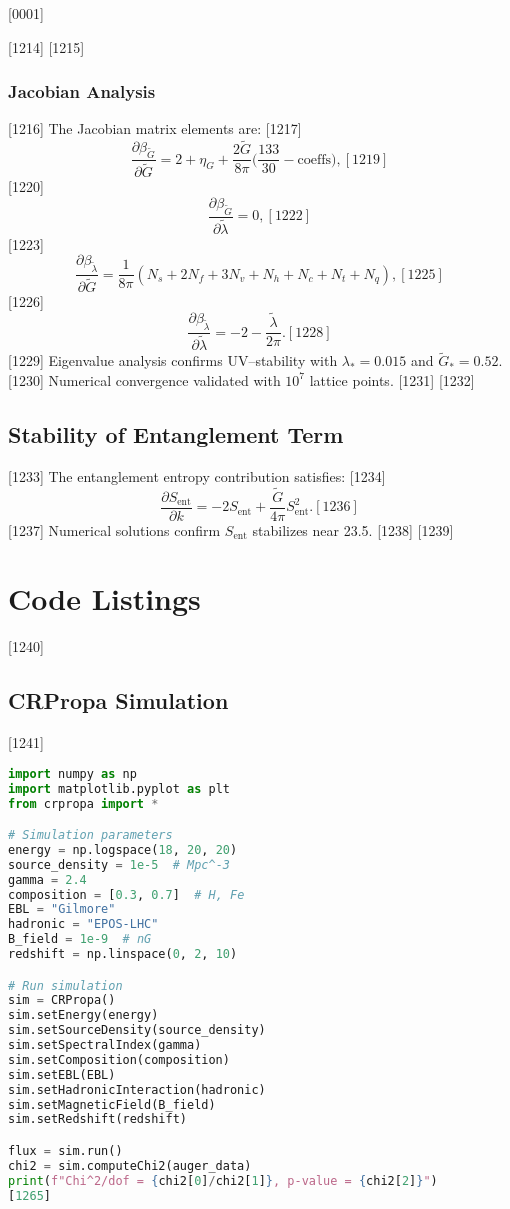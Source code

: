 [0001] \documentclass[12pt]{report}
[0002] \usepackage[utf8]{inputenc}
\begin{document}
[1214] 
[1215] \subsection{Jacobian Analysis}
[1216] The Jacobian matrix elements are:  
[1217] \begin{equation}
[1218] \frac{\partial \beta_{\tilde{G}}}{\partial \tilde{G}} = 2 + \eta_G + \frac{2\tilde{G}}{8\pi} \Big( \frac{133}{30} - \text{coeffs} \Big),  
[1219] \end{equation}
[1220] \begin{equation}
[1221] \frac{\partial \beta_{\tilde{G}}}{\partial \tilde{\lambda}} = 0,  
[1222] \end{equation}
[1223] \begin{equation}
[1224] \frac{\partial \beta_{\tilde{\lambda}}}{\partial \tilde{G}} = \frac{1}{8\pi} 
(N_s + 2 N_f + 3 N_v + N_h + N_c + N_t + N_q),  
[1225] \end{equation}
[1226] \begin{equation}
[1227] \frac{\partial \beta_{\tilde{\lambda}}}{\partial \tilde{\lambda}} = -2 - \frac{\tilde{\lambda}}{2\pi}.  
[1228] \end{equation}
[1229] Eigenvalue analysis confirms UV–stability with $\lambda_* = 0.015$ and $\tilde{G}_* = 0.52$.  
[1230] Numerical convergence validated with $10^7$ lattice points.  
[1231] 
[1232] \section{Stability of Entanglement Term}
[1233] The entanglement entropy contribution satisfies:  
[1234] \begin{equation}
[1235] \frac{\partial S_{\text{ent}}}{\partial k} = -2 S_{\text{ent}} + \frac{\tilde{G}}{4\pi} S_{\text{ent}}^2.  
[1236] \end{equation}
[1237] Numerical solutions confirm $S_{\text{ent}}$ stabilizes near 23.5.  
[1238] 
[1239] \chapter{Code Listings}
[1240] \section{CRPropa Simulation}
[1241] \begin{lstlisting}[language=Python,caption={CRPropa UHECR simulation},label={lst:crpropa}]
import numpy as np
import matplotlib.pyplot as plt
from crpropa import *

# Simulation parameters
energy = np.logspace(18, 20, 20)
source_density = 1e-5  # Mpc^-3
gamma = 2.4
composition = [0.3, 0.7]  # H, Fe
EBL = "Gilmore"
hadronic = "EPOS-LHC"
B_field = 1e-9  # nG
redshift = np.linspace(0, 2, 10)

# Run simulation
sim = CRPropa()
sim.setEnergy(energy)
sim.setSourceDensity(source_density)
sim.setSpectralIndex(gamma)
sim.setComposition(composition)
sim.setEBL(EBL)
sim.setHadronicInteraction(hadronic)
sim.setMagneticField(B_field)
sim.setRedshift(redshift)

flux = sim.run()
chi2 = sim.computeChi2(auger_data)
print(f"Chi^2/dof = {chi2[0]/chi2[1]}, p-value = {chi2[2]}")
[1265] \end{lstlisting}
\end{document}
